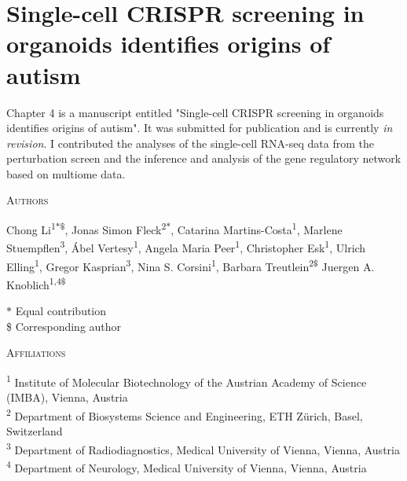 \thispagestyle{plain}
\section{Single-cell CRISPR screening in organoids identifies origins of autism}

\vspace{0.5cm}

Chapter 4 is a manuscript entitled "Single-cell CRISPR screening in organoids identifies origins of autism". It was submitted for publication and is currently \textit{in revision}. I contributed the analyses of the single-cell RNA-seq data from the perturbation screen and the inference and analysis of the gene regulatory network based on multiome data.

\vspace{1cm}

\noindent
{\large\textsc{Authors}}

\noindent
Chong Li\textsuperscript{1$*$\$}, 
Jonas Simon Fleck\textsuperscript{2$*$}, 
Catarina Martins-Costa\textsuperscript{1}, 
Marlene Stuempflen\textsuperscript{3}, 
Ábel Vertesy\textsuperscript{1}, 
Angela Maria Peer\textsuperscript{1}, 
Christopher Esk\textsuperscript{1}, 
Ulrich Elling\textsuperscript{1}, 
Gregor Kasprian\textsuperscript{3}, 
Nina S. Corsini\textsuperscript{1}, 
Barbara Treutlein\textsuperscript{2\$}
Juergen A. Knoblich\textsuperscript{1,4\$}

\vspace{0.5cm}

\noindent
$\ast$ Equal contribution\\
\$ Corresponding author

\vspace{1cm}

\noindent
{\large\textsc{Affiliations}}

\noindent
\textsuperscript{1} Institute of Molecular Biotechnology of the Austrian Academy of Science (IMBA), Vienna, Austria\\
\textsuperscript{2} Department of Biosystems Science and Engineering, ETH Zürich, Basel, Switzerland\\
\textsuperscript{3} Department of Radiodiagnostics, Medical University of Vienna, Vienna, Austria\\
\textsuperscript{4} Department of Neurology, Medical University of Vienna, Vienna, Austria

\vspace{1cm}

